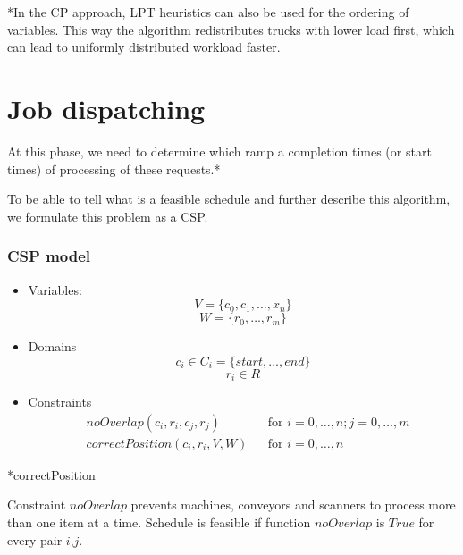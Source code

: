 \documentclass{ctuthesis}
\begin{document}
*In the CP approach, LPT heuristics can also be used for the ordering of variables. This way the algorithm redistributes trucks with lower load first, which can lead to uniformly distributed workload faster.

\section{Job dispatching}

At this phase, we need to determine which ramp a completion times (or start times) of processing of these requests.*

To be able to tell what is a feasible schedule and further describe this algorithm, we formulate this problem as a CSP. 

\subsubsection{CSP model}

\begin{itemize}
    \item Variables:\\
    \begin{equation}
        V = \{c_{0}, c_{1}, \ldots, x_{n}\}
    \end{equation}
    \begin{equation}
        W = \{r_0, \ldots, r_m\}
    \end{equation}
    \item Domains\\
    \begin{equation}
    c_{i} \in C_i = \{start, ..., end\}
    \end{equation}
    \begin{equation}
    r_{i} \in R
    \end{equation}
    \item Constraints
    \begin{equation}
    \begin{aligned}
    & noOverlap(c_i, r_i, c_j, r_j) &&\text{for } i=0,\ldots,n; j=0,\ldots,m\\
    & correctPosition(c_i, r_i, V, W) && \text{for } i=0,\ldots,n
    \end{aligned}
    \end{equation}
\end{itemize}

*correctPosition

Constraint $noOverlap$ prevents machines, conveyors and scanners to process more than one item at a time. Schedule is feasible if function $noOverlap$ is $True$ for every pair $i$,$j$.
\end{document}
